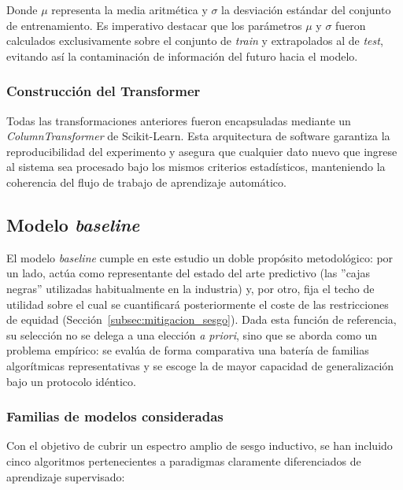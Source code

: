 \documentclass[11pt,a4paper]{article}
\begin{document}
Donde $\mu$ representa la media aritmética y $\sigma$ la desviación estándar del conjunto de entrenamiento. Es imperativo destacar que los parámetros $\mu$ y $\sigma$ fueron calculados exclusivamente sobre el conjunto de \textit{train} y extrapolados al de \textit{test}, evitando así la contaminación de información del futuro hacia el modelo.

\subsubsection{Construcción del Transformer}

Todas las transformaciones anteriores fueron encapsuladas mediante un \textit{ColumnTransformer} de Scikit-Learn. Esta arquitectura de software garantiza la reproducibilidad del experimento y asegura que cualquier dato nuevo que ingrese al sistema sea procesado bajo los mismos criterios estadísticos, manteniendo la coherencia del flujo de trabajo de aprendizaje automático.

\subsection{Modelo \textit{baseline}}
\label{subsec:metodologia_baseline}

El modelo \textit{baseline} cumple en este estudio un doble propósito metodológico: por un lado, actúa como representante del estado del arte predictivo (las ''cajas negras'' utilizadas habitualmente en la industria) y, por otro, fija el techo de utilidad sobre el cual se cuantificará posteriormente el coste de las restricciones de equidad (Sección~\ref{subsec:mitigacion_sesgo}). Dada esta función de referencia, su selección no se delega a una elección \textit{a priori}, sino que se aborda como un problema empírico: se evalúa de forma comparativa una batería de familias algorítmicas representativas y se escoge la de mayor capacidad de generalización bajo un protocolo idéntico.

\subsubsection{Familias de modelos consideradas}

Con el objetivo de cubrir un espectro amplio de sesgo inductivo, se han incluido cinco algoritmos pertenecientes a paradigmas claramente diferenciados de aprendizaje supervisado:
\end{document}
